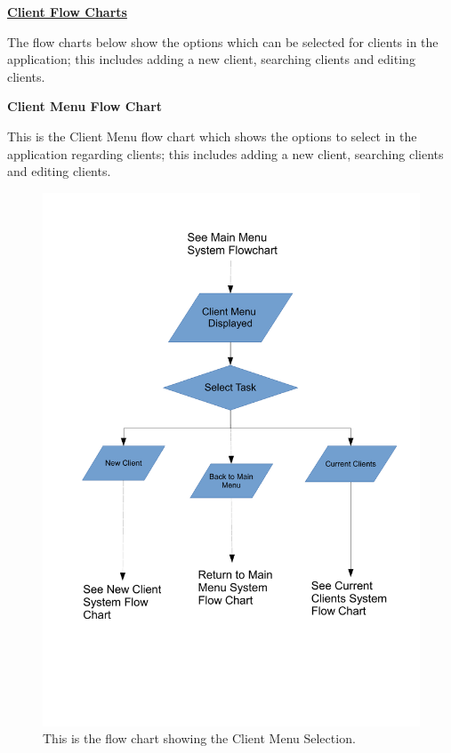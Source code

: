 \pagebreak
\underline{\textbf{Client Flow Charts}}
\begin{flushleft}
The flow charts below show the options which can be selected for clients in the application; this includes adding a new client, searching clients and editing clients.
\end{flushleft}
\textbf{Client Menu Flow Chart}
\begin{flushleft}
This is the Client Menu flow chart which shows the options to select in the application regarding clients; this includes adding a new client, searching clients and editing clients.
\end{flushleft}
\begin{figure}[H]
\includegraphics[scale=0.3]{./Design/images/FlowChartClientMenu.pdf}
    \caption{This is the flow chart showing the Client Menu Selection.} \label{fig:FlowChartClientMenu}
\end{figure}


